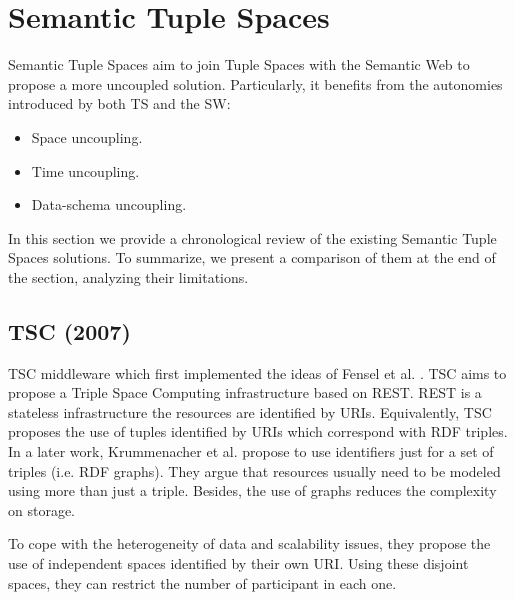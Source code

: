\section{Semantic Tuple Spaces}
\label{sec:tsc_soa}


Semantic Tuple Spaces aim to join Tuple Spaces with the Semantic Web to propose a more uncoupled solution.
Particularly, it benefits from the autonomies introduced by both TS and the SW:

\begin{itemize}
  \item Space uncoupling.
  \item Time uncoupling.
  \item Data-schema uncoupling. %
\end{itemize}


In this section we provide a chronological review of the existing Semantic Tuple Spaces solutions.
To summarize, we present a comparison of them at the end of the section, analyzing their limitations.


\subsection{TSC (2007)}
TSC \cite{fensel_tsc_2007} middleware which first implemented the ideas of Fensel et al. \cite{fensel_triple-space_2004}.
TSC aims to propose a Triple Space Computing infrastructure based on REST.
REST is a stateless infrastructure the resources are identified by URIs.
Equivalently, TSC proposes the use of tuples identified by URIs which correspond with RDF triples.
In a later work,  Krummenacher et al. \cite{krummenacher2006specification} propose to use identifiers just for a set of triples (i.e. RDF graphs).
They argue that resources usually need to be modeled using more than just a triple.
Besides, the use of graphs reduces the complexity on storage.


To cope with the heterogeneity of data and scalability issues, they propose the use of independent spaces identified by their own URI.
Using these disjoint spaces, they can restrict the number of participant in each one.


